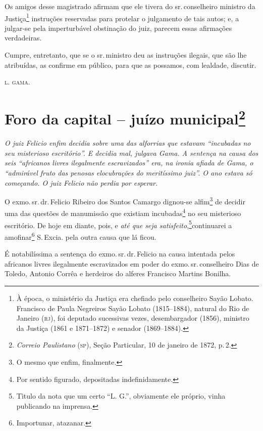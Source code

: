 Os amigos desse magistrado afirmam que ele tivera do sr.\,conselheiro
ministro da Justiça\footnote{ À época, o ministério da Justiça era
  chefiado pelo conselheiro Sayão Lobato. Francisco de Paula Negreiros
  Sayão Lobato (1815--1884), natural do Rio de Janeiro (\textsc{rj}), foi deputado
  sucessivas vezes, desembargador (1856), ministro da Justiça (1861 e
  1871--1872) e senador (1869--1884).} instruções reservadas para protelar
o julgamento de tais autos; e, a julgar-se pela imperturbável obstinação
do juiz, parecem essas afirmações verdadeiras.

Cumpre, entretanto, que se o sr.\,ministro deu as instruções ilegais, que
são lhe atribuídas, as confirme em público, para que as possamos, com
lealdade, discutir.

\textsc{l. gama}.

\chapter{Foro da capital -- juízo municipal\footnote{\emph{Correio Paulistano} (\textsc{sp}), Seção Particular,
  10 de janeiro de 1872, p.\,2.}} %

\begin{didascalia}
\emph{O juiz Felicio enfim decidia sobre uma das alforrias que estavam
``incubadas no seu misterioso escritório''. E decidia mal, julgava Gama. A
sentença na causa dos seis ``africanos livres ilegalmente escravizados''
era, na ironia afiada de Gama, o ``admirável fruto das penosas
elocubrações do meritíssimo juiz''. O ano estava só começando. O juiz
Felicio não perdia por esperar.}
\end{didascalia}

O exmo.\,sr.\,dr.\,Felicio Ribeiro dos Santos Camargo dignou-se
alfim\footnote{ O mesmo que enfim, finalmente.} de decidir uma das
questões de manumissão que existiam incubadas\footnote{ Por sentido
  figurado, depositadas indefinidamente.} no seu misterioso escritório.
De hoje em diante, pois, e \emph{até que seja satisfeito},\footnote{ Tìtulo da nota que um certo ``L. G.'', obviamente ele próprio,
  vinha publicando na imprensa.}continuarei a amofinar\footnote{
  Importunar, atazanar.} S.\,Excia. pela outra causa que lá ficou.

É notabilíssima a sentença do exmo.\,sr.\,dr.\,Felicio na causa intentada
pelos africanos livres ilegalmente escravizados em poder do exmo.\,sr.\,conselheiro Dias de Toledo, Antonio Corrêa e herdeiros do alferes
Francisco Martins Bonilha.

